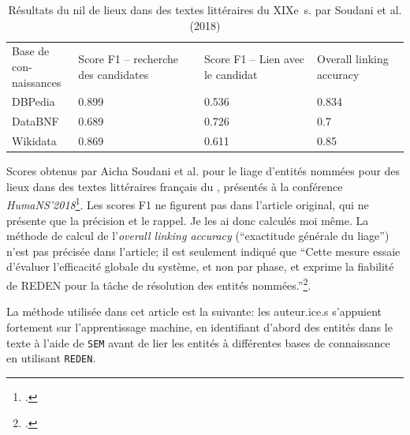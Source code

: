 \begin{table}[h]
	\centering
	\begin{tabular}{m{5cm}m{3cm}m{3cm}m{3cm}}
		\diagbox[innerwidth=5cm]{Score}{Base de con-\\naissances} & Score F1 -- recherche des candidates & Score F1 -- Lien avec le candidat & Overall linking accuracy \\
		DBPedia & 0.899 & 0.536 & 0.834 \\
		DataBNF & 0.689 & 0.726 & 0.7 \\
		Wikidata & 0.869 & 0.611 & 0.85 \\
	\end{tabular}
	\caption{Résultats du \gls{nil} de lieux dans des textes littéraires du XIXe~s. par Soudani et al. (2018)}
	\label{appendix:soudani}
\end{table}
Scores obtenus par Aicha Soudani et al. pour le liage d'entités nommées pour des lieux dans des textes littéraires français du , présentés à la conférence \textit{HumaNS’2018}\footcite[p. 4]{soudani_adaptation_2018}. Les scores F1 ne figurent pas dans l'article original, qui ne présente que la précision et le rappel. Je les ai donc calculés moi même. La méthode de calcul de l'\textit{overall linking accuracy} (\enquote{exactitude générale du liage}) n'est pas précisée dans l'article; il est seulement indiqué que \enquote{Cette mesure essaie d'évaluer l'efficacité globale du système, et non par phase, et exprime la fiabilité de REDEN pour la tâche de résolution des entités nommées.}\footcite[p. 4]{soudani_adaptation_2018}.

La méthode utilisée dans cet article est la suivante: les auteur.ice.s s'appuient fortement sur l'apprentissage machine, en identifiant d'abord des entités dans le texte à l'aide de \texttt{SEM} avant de lier les entités à différentes bases de connaissance en utilisant \texttt{REDEN}.


